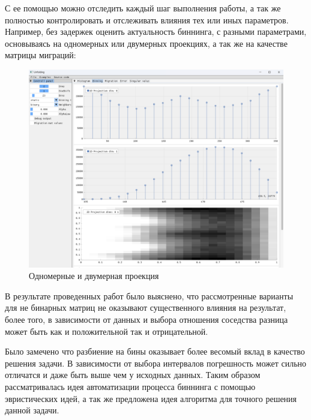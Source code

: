 \documentclass[a4paper,12pt]{diplom}
\begin{document}
С ее помощью можно отследить каждый шаг выполнения работы, а так же полностью контролировать и отслеживать влияния тех или иных параметров. 
Например, без задержек оценить актуальность биннинга, с разными параметрами, основываясь на одномерных или двумерных проекциях, а так же 
на качестве матрицы миграций: 

\clearpage

\begin{figure}[h!]
   \centering
   \includegraphics[width=\linewidth]{images/binning_projections_example.png}
   \caption{Одномерные и двумерная проекция}
\end{figure}

В результате проведенных работ было выяснено, что рассмотренные варианты для не бинарных матриц не оказывают существенного влияния на 
результат, более того, в зависимости от данных и выбора отношения соседства разница может быть как и положительной так и отрицательной. 

Было замечено что разбиение на бины оказывает более весомый вклад в качество решения задачи. В зависимости от выбора интервалов погрешность может 
сильно отличатся и даже быть выше чем у исходных данных. Таким образом рассматривалась идея автоматизации процесса биннинга с помощью эвристических 
идей, а так же предложена идея алгоритма для точного решения данной задачи.
\end{document}

